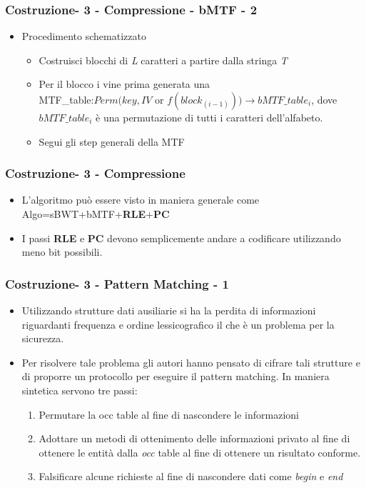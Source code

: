 \documentclass{beamer}
\begin{document}
\begin{frame}
\frametitle{Costruzione- 3 - Compressione - bMTF - 2}
	\begin{itemize}
	\item Procedimento schematizzato
		\begin{itemize}
			\item Costruisci blocchi di \textit{L} caratteri a partire dalla stringa \textit{T}
			\item Per il blocco i vine prima generata una\\ MTF\_table:$ Perm(key,IV$ or $f(block_{(i-1)}))\rightarrow bMTF\_table_{i} $, dove $ bMTF\_table_{i} $ è una permutazione di tutti i caratteri dell'alfabeto.
			\item Segui gli step generali della MTF
		\end{itemize}	 
	\end{itemize}
\end{frame}

\begin{frame}
\frametitle{Costruzione- 3 - Compressione }
	\begin{itemize}
		\item L’algoritmo può essere visto in maniera generale come Algo=sBWT+bMTF+\textbf{RLE}+\textbf{PC}
		\item I passi \textbf{RLE} e \textbf{PC} devono semplicemente andare a codificare utilizzando meno bit possibili. 
	\end{itemize}
\end{frame}

\begin{frame}
\frametitle{Costruzione- 3 - Pattern Matching - 1}
\begin{itemize}
	\item Utilizzando strutture dati ausiliarie si ha la perdita di informazioni riguardanti frequenza e ordine lessicografico il che è un problema per la sicurezza.
	\item Per risolvere tale problema gli autori hanno pensato di cifrare tali strutture e di proporre un protocollo per eseguire il pattern matching. In maniera sintetica servono tre passi:
	\begin{enumerate}
		\item Permutare la occ table al fine di nascondere le informazioni
		\item Adottare un metodi di ottenimento delle informazioni privato al fine di ottenere le entità dalla \textit{occ} table al fine di ottenere un risultato conforme.
		\item Falsificare alcune richieste al fine di nascondere dati come \textit{begin} e \textit{end}
		
	\end{enumerate}	 
\end{itemize}
\end{frame}
\end{document}
